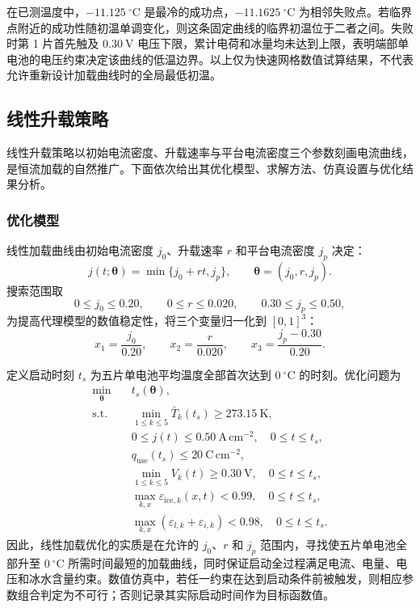 \documentclass{gmcmthesis}
\begin{document}
在已测温度中，$-11.125~^{\circ}\mathrm{C}$ 是最冷的成功点，$-11.1625~^{\circ}\mathrm{C}$ 为相邻失败点。若临界点附近的成功性随初温单调变化，则这条固定曲线的临界初温位于二者之间。失败时第 1 片首先触及 $0.30~\mathrm{V}$ 电压下限，累计电荷和冰量均未达到上限，表明端部单电池的电压约束决定该曲线的低温边界。以上仅为快速网格数值试算结果，不代表允许重新设计加载曲线时的全局最低初温。

\subsection{线性升载策略}
\label{subsec:q2-linear}

线性升载策略以初始电流密度、升载速率与平台电流密度三个参数刻画电流曲线，是恒流加载的自然推广。下面依次给出其优化模型、求解方法、仿真设置与优化结果分析。

\subsubsection{优化模型}

线性加载曲线由初始电流密度 $j_0$、升载速率 $r$ 和平台电流密度 $j_p$ 决定：
\begin{equation}
  j(t;\bm{\theta})=\min\{j_0+rt,j_p\},
  \qquad \bm{\theta}=(j_0,r,j_p).
  \label{eq:q2-linear-current}
\end{equation}
搜索范围取
\begin{equation}
  0\le j_0\le0.20,\qquad
  0\le r\le0.020,\qquad
  0.30\le j_p\le0.50,
  \label{eq:q2-search-domain}
\end{equation}
为提高代理模型的数值稳定性，将三个变量归一化到 $[0,1]^3$：
\begin{equation}
  x_1=\frac{j_0}{0.20},\qquad
  x_2=\frac{r}{0.020},\qquad
  x_3=\frac{j_p-0.30}{0.20}.
\end{equation}

定义启动时刻 $t_s$ 为五片单电池平均温度全部首次达到 $0~^{\circ}\mathrm{C}$ 的时刻。优化问题为
\begin{align}
  \min_{\bm{\theta}}\quad & t_s(\bm{\theta}), \label{eq:q2-objective}\\
  \text{s.t.}\quad
  & \min_{1\le k\le5}\bar T_k(t_s)\ge273.15~\mathrm{K}, \nonumber\\
  & 0\le j(t)\le0.50~\mathrm{A\,cm^{-2}}, \quad 0\le t\le t_s, \nonumber\\
  & q_{\mathrm{use}}(t_s)\le20~\mathrm{C\,cm^{-2}}, \nonumber\\
  & \min_{1\le k\le5}V_k(t)\ge0.30~\mathrm{V}, \quad 0\le t\le t_s, \nonumber\\
  & \max_{k,x}\varepsilon_{\mathrm{ice},k}(x,t)<0.99, \quad 0\le t\le t_s, \nonumber\\
  & \max_{k,x}\left(\varepsilon_{l,k}+\varepsilon_{i,k}\right)<0.98,
  \quad 0\le t\le t_s. \nonumber
\end{align}
因此，线性加载优化的实质是在允许的 $j_0$、$r$ 和 $j_p$ 范围内，寻找使五片单电池全部升至 $0~^{\circ}\mathrm{C}$ 所需时间最短的加载曲线，同时保证启动全过程满足电流、电量、电压和冰水含量约束。数值仿真中，若任一约束在达到启动条件前被触发，则相应参数组合判定为不可行；否则记录其实际启动时间作为目标函数值。
\end{document}
